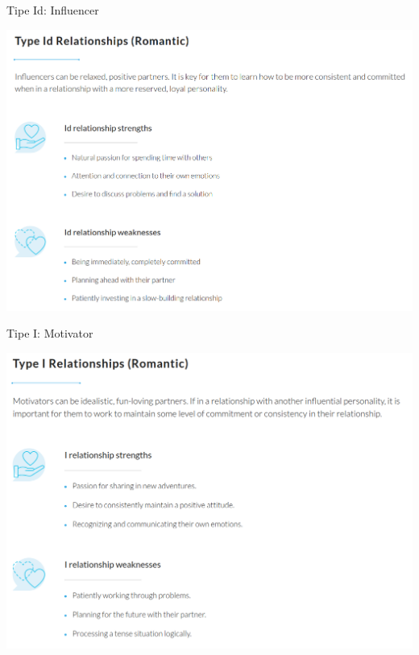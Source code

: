 \documentclass{beamer}
\theoremstyle{mystyle}
\begin{document}
\begin{frame}{Tipe Id: Influencer}
	\begin{center}
		\includegraphics[scale=.275]{images/Id}
	\end{center}
\end{frame}

\begin{frame}{Tipe I: Motivator}
	\begin{center}
		\includegraphics[scale=.275]{images/I}
	\end{center}
\end{frame}
\end{document}
